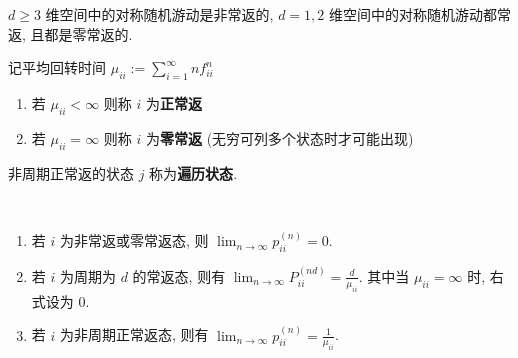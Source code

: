 \documentclass[10pt]{yerbaformat}
\begin{document}
\begin{theorem}[Polya 定理]
    $d \geq 3$ 维空间中的对称随机游动是非常返的, $d=1,2$ 维空间中的对称随机游动都常返, 且都是零常返的.
\end{theorem}

\begin{definition}[正常返与零常返]
    记平均回转时间 $\mu_{i i}:=\sum_{i=1}^{\infty} n f_{i i}^{n}$
    \begin{enumerate}
        \item 若 $\mu_{i i}<\infty$ 则称 $i$ 为\textbf{正常返}
        \item 若 $\mu_{i i}=\infty$ 则称 $i$ 为\textbf{零常返} (无穷可列多个状态时才可能出现)
    \end{enumerate}
    非周期正常返的状态 $j$ 称为\textbf{遍历状态}.
\end{definition}



\begin{theorem}[基本极限定理]
    \ 
    \begin{enumerate}
        \item 若 $i$ 为非常返或零常返态, 则 $\lim _{n \rightarrow \infty} p_{i i}^{(n)}=0 .$
        \item 若 $i$ 为周期为 $d$ 的常返态, 则有 $\lim _{n \rightarrow \infty} P_{i i}^{(n d)}=\frac{d}{\mu_{i i}}$.
              其中当 $\mu_{i i}=\infty$ 时, 右式设为 $0.$
        \item 若 $i$ 为非周期正常返态, 则有 $\lim _{n \rightarrow \infty} p_{i i}^{(n)}=\frac{1}{\mu_{i i}}$.
    \end{enumerate}
\end{theorem}
\end{document}
